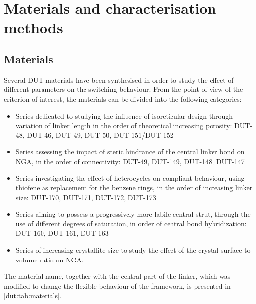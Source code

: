
\section{Materials and characterisation methods}

\subsection{Materials}

Several DUT materials have been synthesised in order to 
study the effect of different parameters on the switching 
behaviour. From the point of view of the criterion of interest,
the materials can be divided into the following categories:

\begin{itemize}
    \item Series dedicated to studying the influence of isoreticular
    design through variation of linker length in the order of 
    theoretical increasing porosity: DUT-48, DUT-46, DUT-49, 
    DUT-50, DUT-151/DUT-152
    \item Series assessing the impact of steric hindrance of the 
    central linker bond on NGA, in the order of connectivity:
    DUT-49, DUT-149, DUT-148, DUT-147
    \item Series investigating the effect of heterocycles on compliant
    behaviour, using thiofene as replacement for the benzene rings, 
    in the order of increasing linker size: DUT-170, DUT-171, DUT-172,
    DUT-173
    \item Series aiming to possess a progressively more labile central 
    strut, through the use of different degrees of saturation,
    in order of central bond hybridization: DUT-160, DUT-161, DUT-163
    \item Series of increasing crystallite size to study the effect 
    of the crystal surface to volume ratio on NGA.
\end{itemize}

The material name, together with the central part of the linker, 
which was modified to change the flexible behaviour of the framework,
is presented in \autoref{dut:tab:materials}.

